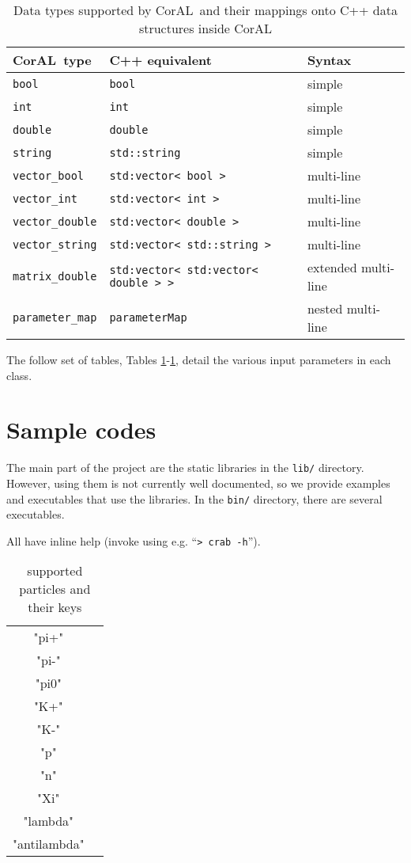 \documentclass[10pt]{article}
\newcommand{\coral}{CorAL}
\begin{document}
\begin{table}
	\begin{tabular}{lll}
		\hline\hline
		\coral\ type 	& C++ equivalent & Syntax \\ \hline \hline
		{\tt bool}		& {\tt bool} & simple \\
		{\tt int}		& {\tt int} & simple \\
		{\tt double} 	& {\tt double} & simple  \\
		{\tt string}		& {\tt std::string} & simple \\
		{\tt vector\_bool}	& {\tt std:vector< bool > } & multi-line \\
		{\tt vector\_int}		& {\tt std:vector< int > } & multi-line \\
		{\tt vector\_double}	& {\tt std:vector< double > } & multi-line \\
		{\tt vector\_string}	& {\tt std:vector< std::string > }  & multi-line\\
		{\tt matrix\_double} 	& {\tt std:vector< std:vector< double > > }  & extended  multi-line\\
		{\tt parameter\_map}& {\tt parameterMap}& nested multi-line\\\hline
	\end{tabular}
	\caption{\label{table:types}Data types supported by \coral \  and their mappings onto C++ data structures inside \coral}
\end{table}


The follow set of tables, Tables \ref{}-\ref{}, detail the various input parameters in each class.

\section{Sample codes}
The main part of the project are the static libraries in the {\tt lib/} directory.  
However, using them is not currently well documented, so we provide examples and 
executables that use the libraries.  In the {\tt bin/} directory, there are several 
executables.

All have inline help (invoke using e.g. ``{\tt > crab -h}'').

\begin{table}[htdp]
\caption{supported particles and their keys}
\begin{center}
\begin{tabular}{|c|c|}
"pi+"&\\
"pi-"&\\
"pi0"&\\
"K+"&\\
"K-"&\\
"p"&\\
"n"&\\
"Xi"&\\
"lambda"&\\
"antilambda"
\end{tabular}
\end{center}
\label{supported particles}
\end{table}%
\end{document}
